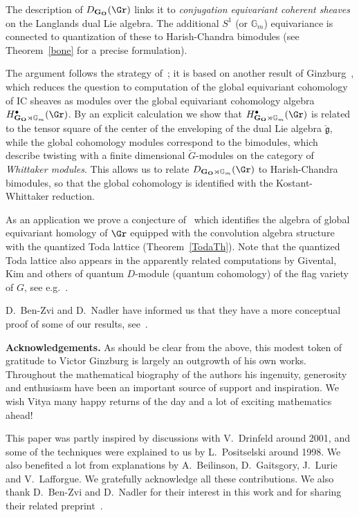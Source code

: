 \documentclass[11pt]{amsart}
\theoremstyle{definition}
\theoremstyle{remark}
\theoremstyle{remark}
\newcommand{\<}{\langle}
\renewcommand{\>}{\rangle}
\newcommand{\Lg}{\check{\mathfrak g}{}}
\newcommand{\LG}{{\check{G}}}
\newcommand{\GO}{{\bf G_O}}
\newcommand{\Gm}{{{\mathbb G}_m}}
\newcommand{\DerSatak}{{D_{\GO\rtimes\Gm}(\Gr)}}
\newcommand{\DerSatakneloop}{{D_{\GO}(\Gr)}}
\begin{document}
The description of $\DerSatakneloop$ links it to 
{\em conjugation equivariant coherent sheaves} on the Langlands dual Lie
algebra. The additional $S^1$
(or $\Gm$) equivariance is connected to quantization
of these to Harish-Chandra bimodules (see Theorem~\ref{bone} for
a precise formulation).

The argument follows the strategy of~\cite{G}; 
it is based on another result of Ginzburg~\cite{G0},
which reduces the question to computation of the global equivariant
cohomology of IC sheaves as modules over the global equivariant
cohomology algebra $H^\bullet_{\GO\rtimes\Gm}(\Gr)$.
By an explicit calculation we show that $H^\bullet_{\GO\rtimes\Gm}(\Gr)$ 
is related to the 
tensor square of the center of the enveloping of the dual Lie algebra
$\Lg$, while the global cohomology modules correspond to the bimodules,
which describe twisting with a finite dimensional $\LG$-modules
on the category of {\em Whittaker modules}.
 This allows us to  relate $\DerSatak$
to Harish-Chandra bimodules, so that the global cohomology is identified
with the Kostant-Whittaker reduction.

As an application we prove a conjecture of~\cite{BFM} which
identifies the algebra of global equivariant homology
of $\Gr$ equipped with the convolution algebra structure with
the quantized Toda lattice (Theorem~\ref{TodaTh}).
Note that the quantized Toda lattice also appears in the apparently related
computations by Givental, Kim and others of quantum $D$-module 
(quantum cohomology) of the flag variety of $G$, see e.g.~\cite{Kim}.

D.~Ben-Zvi and D.~Nadler have informed us that they have a more conceptual
proof of some of our results, see~\cite{BN}.

{\bf Acknowledgements.} As should be clear from the above, 
this modest token of gratitude to Victor
Ginzburg is largely an outgrowth of his own works.
Throughout the mathematical biography of the authors
his ingenuity, generosity and enthusiasm have been an important source of
 support and inspiration.
We wish Vitya many happy returns of the day and a lot of exciting
mathematics ahead!

This paper was partly inspired by discussions 
with V.~Drinfeld around 2001, and some of the techniques were 
explained to us by L.~Positselski around 1998.
We also benefited a lot from explanations by
A.~Beilinson, D.~Gaitsgory, J.~Lurie and V.~Lafforgue. We gratefully
acknowledge all these contributions.
 We also thank D.~Ben-Zvi and D.~Nadler for their interest
in this work and for sharing their related preprint~\cite{BN}.
\end{document}

